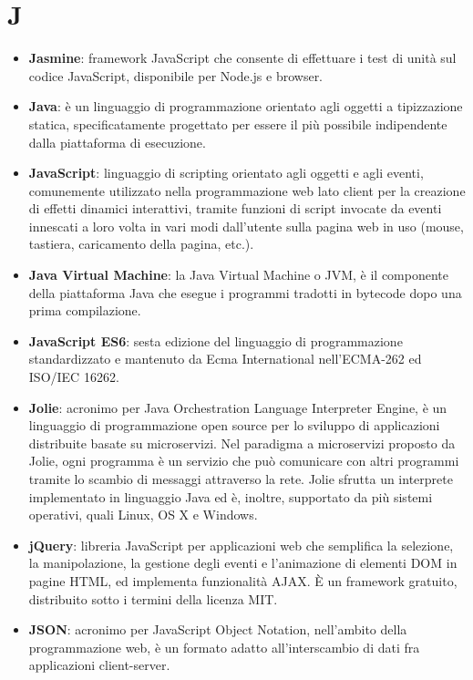 \newpage
\section{J}

\begin{itemize}
	\item \textbf{Jasmine}: framework JavaScript che consente di effettuare i test di unità sul codice JavaScript, disponibile per Node.js e browser.
	\item \textbf{Java}: è un linguaggio di programmazione orientato agli oggetti a tipizzazione statica, specificatamente progettato per essere il più possibile indipendente dalla piattaforma di esecuzione.
	\item \textbf{JavaScript}: linguaggio di scripting orientato agli oggetti e agli eventi, comunemente utilizzato nella programmazione web lato client per la creazione di effetti dinamici interattivi, tramite funzioni di script invocate da eventi innescati a loro volta in vari modi dall'utente sulla pagina web in uso (mouse, tastiera, caricamento della pagina, etc.).
	\item \textbf{Java Virtual Machine}: la Java Virtual Machine o JVM, è il componente della piattaforma Java che esegue i programmi tradotti in bytecode dopo una prima compilazione.
	\item \textbf{JavaScript ES6}: sesta edizione del linguaggio di programmazione standardizzato e mantenuto da Ecma International nell'ECMA-262 ed ISO/IEC 16262.
	\item \textbf{Jolie}: acronimo per Java Orchestration Language Interpreter Engine, è un linguaggio di programmazione open source per lo sviluppo di applicazioni distribuite basate su microservizi. Nel paradigma a microservizi proposto da Jolie, ogni programma è un servizio che può comunicare con altri programmi tramite lo scambio di messaggi attraverso la rete. Jolie sfrutta un interprete implementato in linguaggio Java ed è, inoltre, supportato da più sistemi operativi, quali Linux, OS X e Windows.
	\item \textbf{jQuery}: libreria JavaScript per applicazioni web che semplifica la selezione, la manipolazione, la gestione degli eventi e l'animazione di elementi DOM in pagine HTML, ed implementa funzionalità AJAX. \MakeUppercase{è} un framework gratuito, distribuito sotto i termini della licenza MIT.
	\item \textbf{JSON}: acronimo per JavaScript Object Notation, nell'ambito della programmazione web, è un formato adatto all'interscambio di dati fra applicazioni client-server.
\end{itemize}
